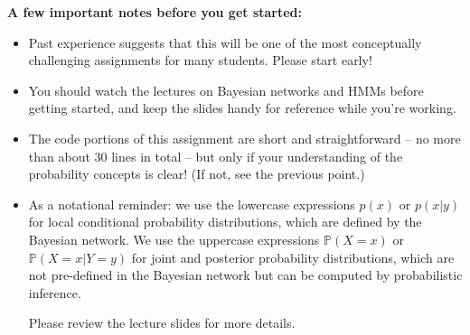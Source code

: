 {\bf A few important notes before you get started: }  

\begin{itemize}
\item Past experience suggests that this will be one of the most conceptually
  challenging assignments for many students.  Please start early!
\item You should watch the lectures on Bayesian
networks and HMMs before getting started, and keep the slides handy for
reference while you're working.
\item The code portions of this assignment are short and straightforward -- no
more than about 30 lines in total -- but only if your understanding of the
probability concepts is clear!  (If not, see the previous point.)
\item As a notational reminder: we use the lowercase expressions $p(x)$ or
$p(x\vert y)$ for local conditional probability distributions, which are defined by
the Bayesian network.  We use the uppercase expressions $\mathbb P(X = x)$ or
$\mathbb P(X = x \vert Y = y)$ for joint and posterior probability distributions,
which are not pre-defined in the Bayesian network but can be computed by
probabilistic inference.

Please review the lecture slides for more details.
\end{itemize}

